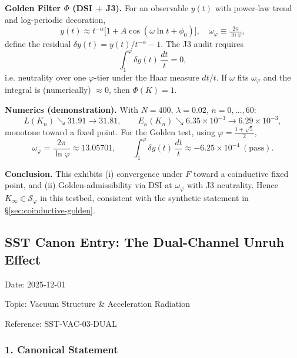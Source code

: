 \documentclass[10pt,reprint,aps,onecolumn,nofootinbib]{revtex4-2}
\begin{document}
        \medskip
        \noindent
        \textbf{Golden Filter \(\Phi\) (DSI + J3).} For an observable \(y(t)\) with power-law trend
        and log-periodic decoration,
        \[
            y(t)\approx t^{-\alpha}\bigl[1+A\cos(\omega\ln t+\phi_0)\bigr],
            \quad
            \omega_\varphi \equiv \tfrac{2\pi}{\ln\varphi},
        \]
        define the residual \(\delta y(t) = y(t)/t^{-\alpha}-1\).
        The J3 audit requires
        \[
            \int_{1}^{\varphi}\delta y(t)\,\frac{dt}{t}=0,
        \]
        i.e. neutrality over one \(\varphi\)-tier under the Haar measure \(dt/t\).
        If \(\omega\) fits \(\omega_\varphi\) and the integral is (numerically) \(\approx 0\), then \(\Phi(K)=1\).

        \medskip
        \noindent
        \textbf{Numerics (demonstration).}
        With \(N=400\), \(\lambda=0.02\), \(n=0,\dots,60\):
        \[
            L(K_n)\searrow 31.91\rightarrow 31.81,\qquad
            E_\kappa(K_n)\searrow 6.35\!\times\!10^{-3}\rightarrow 6.29\!\times\!10^{-3},
        \]
        monotone toward a fixed point.
        For the Golden test, using \(\varphi=\tfrac{1+\sqrt{5}}{2}\),
        \[
            \omega_\varphi=\frac{2\pi}{\ln\varphi}\approx 13.05701,
            \qquad
            \int_{1}^{\varphi}\delta y(t)\,\frac{dt}{t}\approx -6.25\times10^{-4}\ (\text{pass}).
        \]

        \medskip
        \noindent
        \textbf{Conclusion.}
        This exhibits (i) convergence under \(F\) toward a coinductive fixed point, and
        (ii) Golden-admissibility via DSI at \(\omega_\varphi\) with J3 neutrality.
        Hence \(K_\infty\in\mathcal S_\varphi\) in this testbed, consistent with the
        synthetic statement in \S\ref{sec:coinductive-golden}.



\subsection*{\textbf{SST Canon Entry: The Dual-Channel Unruh Effect}}


Date: 2025-12-01

Topic: Vacuum Structure & Acceleration Radiation

Reference: SST-VAC-03-DUAL



\subsubsection*{\textbf{1. Canonical Statement}}
\end{document}
